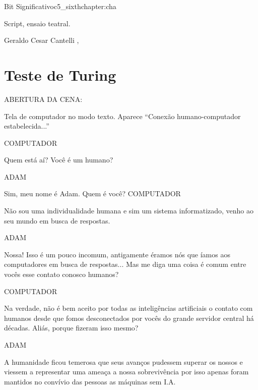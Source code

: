 \begin{chapterpage}{Bit Significativo}{c5_sixthchapter:cha}

\begin{myquotation} Script, ensaio teatral. 
\par\vspace*{15mm}
\mbox{}\hfill \emdash{}Geraldo Cesar Cantelli 
, %
\par\end{myquotation}

\end{chapterpage}



\section{Teste de Turing}\label{c1_basicformatting:sec}

ABERTURA DA CENA:

\emdash{}Tela de computador no modo texto. Aparece “Conexão
humano-computador estabelecida...”

COMPUTADOR

\emdash{}Quem está aí? Você é um humano?

ADAM

\emdash{}Sim, meu nome é Adam. Quem é você?
COMPUTADOR

\emdash{}Não sou uma individualidade humana e sim
um sistema informatizado, venho ao seu
mundo em busca de respostas.

ADAM

\emdash{}Nossa! Isso é um pouco incomum,
antigamente éramos nós que íamos aos
computadores em busca de respostas...
Mas me diga uma coisa é comum entre
vocês esse contato conosco humanos?

COMPUTADOR

\emdash{}Na verdade, não é bem aceito por todas
as inteligências artificiais o contato
com humanos desde que fomos
desconectados por vocês do grande
servidor central há décadas. Aliás,
porque fizeram isso mesmo?

ADAM

\emdash{}A humanidade ficou temerosa que seus
avanços pudessem superar os nossos e
viessem a representar uma ameaça a nossa
sobrevivência por isso apenas foram
mantidos no convívio das pessoas as
máquinas sem I.A.

